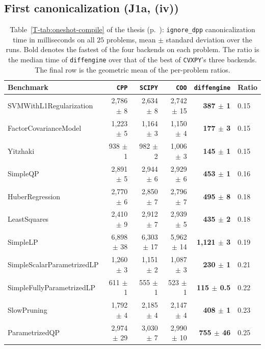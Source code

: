 \documentclass[letterpaper,12pt]{article}
\newcommand{\tpage}[1]{p.~\pageref{T-#1}}
\begin{document}
\subsection{First canonicalization (J1a, (iv))}

\begin{table}[htbp]
\centering
\caption{Table~\ref{T-tab:oneshot-compile} of the thesis (\tpage{tab:oneshot-compile}): \texttt{ignore\_dpp} canonicalization
time in milliseconds on all $25$ problems, mean $\pm$ standard deviation over the runs.
Bold denotes the fastest of the four backends on each problem. The ratio is the median time
of \texttt{diffengine} over that of the best of \texttt{CVXPY}'s three backends. The final row
is the geometric mean of the per-problem ratios.}
\label{tab:new-oneshot}
{\footnotesize
\setlength{\tabcolsep}{3pt}
\begin{tabular}{l r r r r l}
\toprule
Benchmark & \texttt{CPP} & \texttt{SCIPY} & \texttt{COO} &
\texttt{diffengine} & Ratio \\
\midrule
SVMWithL1Regularization     & 2{,}786 $\pm$ 8 & 2{,}634 $\pm$ 8 & 2{,}742 $\pm$ 15 & \textbf{387 $\pm$ 1} & 0.15 \\
FactorCovarianceModel       & 1{,}223 $\pm$ 5 & 1{,}164 $\pm$ 3 & 1{,}150 $\pm$ 4 & \textbf{177 $\pm$ 3} & 0.15 \\
Yitzhaki                    & 938 $\pm$ 1 & 982 $\pm$ 2 & 1{,}006 $\pm$ 3 & \textbf{145 $\pm$ 1} & 0.15 \\
SimpleQP                    & 2{,}891 $\pm$ 5 & 2{,}944 $\pm$ 6 & 2{,}929 $\pm$ 6 & \textbf{453 $\pm$ 1} & 0.16 \\
HuberRegression             & 2{,}770 $\pm$ 6 & 2{,}850 $\pm$ 7 & 2{,}796 $\pm$ 7 & \textbf{495 $\pm$ 8} & 0.18 \\
LeastSquares                & 2{,}410 $\pm$ 9 & 2{,}912 $\pm$ 7 & 2{,}939 $\pm$ 5 & \textbf{435 $\pm$ 2} & 0.18 \\
SimpleLP                    & 6{,}898 $\pm$ 38 & 6{,}303 $\pm$ 17 & 5{,}962 $\pm$ 14 & \textbf{1{,}121 $\pm$ 3} & 0.19 \\
SimpleScalarParametrizedLP  & 1{,}260 $\pm$ 3 & 1{,}151 $\pm$ 2 & 1{,}087 $\pm$ 3 & \textbf{230 $\pm$ 1} & 0.21 \\
SimpleFullyParametrizedLP   & 611 $\pm$ 1 & 555 $\pm$ 1 & 523 $\pm$ 1 & \textbf{115 $\pm$ 0.5} & 0.22 \\
SlowPruning                 & 1{,}792 $\pm$ 4 & 2{,}185 $\pm$ 4 & 2{,}147 $\pm$ 4 & \textbf{408 $\pm$ 1} & 0.23 \\
ParametrizedQP              & 2{,}974 $\pm$ 29 & 3{,}030 $\pm$ 7 & 2{,}990 $\pm$ 10 & \textbf{755 $\pm$ 46} & 0.25 \\

\end{tabular}}
\end{table}
\end{document}

